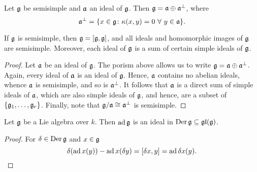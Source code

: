 \begin{porism}
    Let $\mathfrak{g}$ be semisimple and $\mathfrak{a}$ an ideal of $\mathfrak{g}$. Then $\mathfrak{g} = \mathfrak{a}\oplus\mathfrak{a}^\perp$, where 
    \begin{equation*}
        \mathfrak{a}^\perp = \{x\in\mathfrak{g}\colon\kappa(x, y) = 0~\forall~y\in\mathfrak{a}\}.
    \end{equation*}
\end{porism}

\begin{corollary}
    If $\mathfrak{g}$ is semisimple, then $\mathfrak{g} = [\mathfrak{g},\mathfrak{g}]$, and all ideals and homomorphic images of $\mathfrak{g}$ are semisimple. Moreover, each ideal of $\mathfrak{g}$ is a sum of certain simple ideals of $\mathfrak{g}$.
\end{corollary}
\begin{proof}
    Let $\mathfrak{a}$ be an ideal of $\mathfrak{g}$. The porism above allows us to write $\mathfrak{g} = \mathfrak{a}\oplus\mathfrak{a}^\perp$. Again, every ideal of $\mathfrak{a}$ is an ideal of $\mathfrak{g}$. Hence, $\mathfrak{a}$ contains no abelian ideals, whence $\mathfrak{a}$ is semisimple, and so is $\mathfrak{a}^\perp$. It follows that $\mathfrak{a}$ is a direct sum of simple ideals of $\mathfrak{a}$, which are also simple ideals of $\mathfrak{g}$, and hence, are a subset of $\{\mathfrak{g}_1,\dots,\mathfrak{g}_r\}$. Finally, note that $\mathfrak{g}/\mathfrak{a}\cong\mathfrak{a}^\perp$ is semisimple.
\end{proof}

\begin{lemma}
    Let $\mathfrak{g}$ be a Lie algebra over $k$. Then $\operatorname{ad}\mathfrak{g}$ is an ideal in $\operatorname{Der}\mathfrak{g}\subseteq\mathfrak{gl}(\mathfrak{g})$.
\end{lemma}
\begin{proof}
    For $\delta\in\operatorname{Der}\mathfrak{g}$ and $x\in\mathfrak{g}$ 
    \begin{equation*}
        \delta(\operatorname{ad} x(y)) - \operatorname{ad} x(\delta y)  = [\delta x, y] = \operatorname{ad}\delta x(y).\qedhere
    \end{equation*}
\end{proof}

